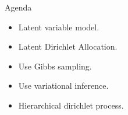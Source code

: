 \begin{frame}{Agenda}
\begin{itemize}
\item Latent variable model.
\item Latent Dirichlet Allocation.
\item Use Gibbs sampling.
\item Use variational inference.
\item Hierarchical dirichlet process.
\end{itemize}
\end{frame}
